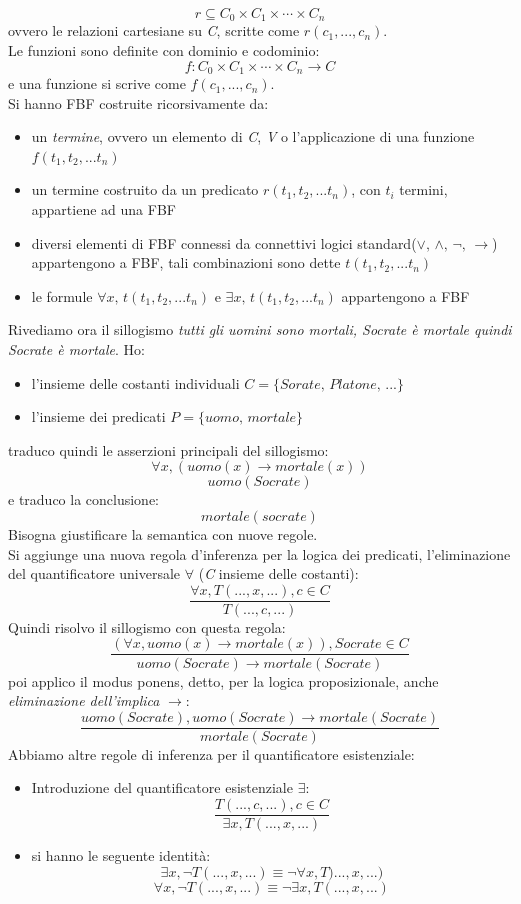 \documentclass[a4paper,12pt, oneside]{book}
\begin{document}
$$r\subseteq C_0\times C_1\times\cdots\times C_n$$
ovvero le relazioni cartesiane su \textit{C}, scritte come $r(c_1,...,c_n)$.\\
Le funzioni sono definite con dominio e codominio:
$$f:C_0\times C_1\times\cdots\times C_n\to C$$
e una funzione si scrive come $f(c_1,...,c_n)$.\\
Si hanno FBF costruite ricorsivamente da:
\begin{itemize}
\item un \textit{termine}, ovvero un elemento di \textit{C}, \textit{V} o l'applicazione di una funzione $f(t_1,t_2,...t_n)$
\item un termine costruito da un predicato $r(t_1,t_2,...t_n)$, con $t_i$ termini, appartiene ad una FBF
\item diversi elementi di FBF connessi da connettivi logici standard($\vee,\,\wedge,\,\neg,\,\to$) appartengono a FBF, tali combinazioni sono dette $t(t_1,t_2,...t_n)$
\item le formule $\forall x,\,t(t_1,t_2,...t_n)$ e $\exists x,\,t(t_1,t_2,...t_n)$ appartengono a FBF
\end{itemize}
Rivediamo ora il sillogismo \textit{tutti gli uomini sono mortali, Socrate è mortale quindi Socrate è mortale}. Ho:
\begin{itemize}
\item l'insieme delle costanti individuali $C=\{Sorate,\, Platone,\,...\}$
\item l'insieme dei predicati $P=\{uomo,\,mortale\}$
\end{itemize}
traduco quindi le asserzioni principali del sillogismo:
$$\forall x, (uomo(x)\to mortale(x))$$
$$uomo(Socrate)$$
e traduco la conclusione:
$$mortale(socrate)$$
Bisogna giustificare la semantica con nuove regole.\\
Si aggiunge una nuova regola d'inferenza per la logica dei predicati, l'eliminazione del quantificatore universale $\forall$ (\textit{C} insieme delle costanti):
$$\frac{\forall x, T(...,x,...), c\in C}{T(...,c,...)}$$
Quindi risolvo il sillogismo con questa regola:
$$\frac{(\forall x, uomo(x)\to mortale(x)), Socrate\in C}{uomo(Socrate)\to mortale(Socrate)}$$
poi applico il modus ponens, detto, per la logica proposizionale, anche \textit{eliminazione dell'implica} $\to$:
$$\frac{uomo(Socrate), uomo(Socrate)\to mortale(Socrate)}{mortale(Socrate)}$$
Abbiamo altre regole di inferenza per il quantificatore esistenziale:
\begin{itemize}
\item Introduzione del quantificatore esistenziale $\exists$:
$$\frac{T(...,c,...), c\in C}{\exists x, T(...,x,...)}$$
\item si hanno le seguente identità:
$$\exists x, \neg T(...,x,...)\equiv \neg\forall x, T)...,x,...)$$
$$\forall x, \neg T(...,x,...)\equiv \neg\exists x, T(...,x,...)$$
\end{itemize}
\end{document}
